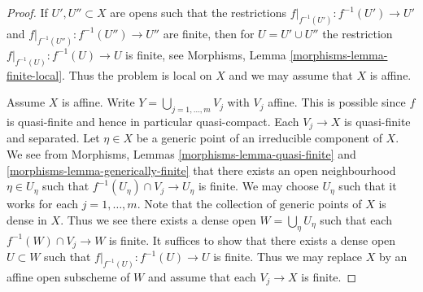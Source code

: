 \begin{proof}
If $U', U'' \subset X$ are opens such that the restrictions
$f|_{f^{-1}(U')} : f^{-1}(U') \to U'$ and
$f|_{f^{-1}(U'')} : f^{-1}(U'') \to U''$ are finite,
then for $U = U' \cup U''$ the restriction $f|_{f^{-1}(U)} : f^{-1}(U) \to U$
is finite, see
Morphisms, Lemma \ref{morphisms-lemma-finite-local}.
Thus the problem is local on $X$ and we may assume that $X$ is affine.

\medskip\noindent
Assume $X$ is affine.
Write $Y = \bigcup_{j = 1, \ldots, m} V_j$ with $V_j$ affine.
This is possible since $f$ is quasi-finite and hence
in particular quasi-compact. Each $V_j \to X$ is quasi-finite
and separated. Let $\eta \in X$ be a generic point of an irreducible
component of $X$. We see from
Morphisms, Lemmas
\ref{morphisms-lemma-quasi-finite} and \ref{morphisms-lemma-generically-finite}
that there exists an open neighbourhood $\eta \in U_\eta$ such that
$f^{-1}(U_\eta) \cap V_j \to U_\eta$ is finite. We may choose $U_\eta$ such
that it works for each $j = 1, \ldots, m$.
Note that the collection of generic points of $X$ is dense in $X$.
Thus we see there exists a dense open $W = \bigcup_\eta U_\eta$
such that each $f^{-1}(W) \cap V_j \to W$ is finite.
It suffices to show that there exists a dense open $U \subset W$
such that $f|_{f^{-1}(U)} : f^{-1}(U) \to U$ is finite.
Thus we may replace $X$ by an affine open subscheme of $W$ and
assume that each $V_j \to X$ is finite.


\end{proof}
